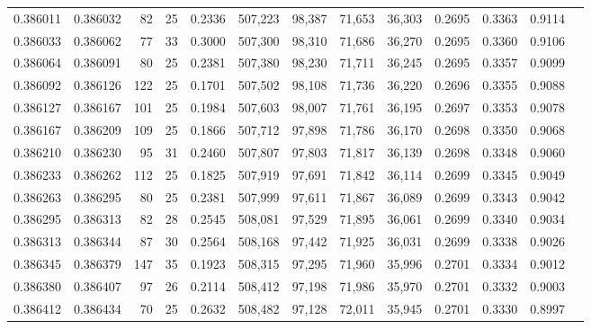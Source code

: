 \begin{tabular}{rrrrrrrrrrrrr}
0.386011 & 0.386032 &    82 &  25 &                                     0.2336 & 507,223 &  98,387 &  71,653 &  36,303 & 0.2695 & 0.3363 & 0.9114 \\
0.386033 & 0.386062 &    77 &  33 &                                     0.3000 & 507,300 &  98,310 &  71,686 &  36,270 & 0.2695 & 0.3360 & 0.9106 \\
0.386064 & 0.386091 &    80 &  25 &                                     0.2381 & 507,380 &  98,230 &  71,711 &  36,245 & 0.2695 & 0.3357 & 0.9099 \\
0.386092 & 0.386126 &   122 &  25 &                                     0.1701 & 507,502 &  98,108 &  71,736 &  36,220 & 0.2696 & 0.3355 & 0.9088 \\
0.386127 & 0.386167 &   101 &  25 &                                     0.1984 & 507,603 &  98,007 &  71,761 &  36,195 & 0.2697 & 0.3353 & 0.9078 \\
0.386167 & 0.386209 &   109 &  25 &                                     0.1866 & 507,712 &  97,898 &  71,786 &  36,170 & 0.2698 & 0.3350 & 0.9068 \\
0.386210 & 0.386230 &    95 &  31 &                                     0.2460 & 507,807 &  97,803 &  71,817 &  36,139 & 0.2698 & 0.3348 & 0.9060 \\
0.386233 & 0.386262 &   112 &  25 &                                     0.1825 & 507,919 &  97,691 &  71,842 &  36,114 & 0.2699 & 0.3345 & 0.9049 \\
0.386263 & 0.386295 &    80 &  25 &                                     0.2381 & 507,999 &  97,611 &  71,867 &  36,089 & 0.2699 & 0.3343 & 0.9042 \\
0.386295 & 0.386313 &    82 &  28 &                                     0.2545 & 508,081 &  97,529 &  71,895 &  36,061 & 0.2699 & 0.3340 & 0.9034 \\
0.386313 & 0.386344 &    87 &  30 &                                     0.2564 & 508,168 &  97,442 &  71,925 &  36,031 & 0.2699 & 0.3338 & 0.9026 \\
0.386345 & 0.386379 &   147 &  35 &                                     0.1923 & 508,315 &  97,295 &  71,960 &  35,996 & 0.2701 & 0.3334 & 0.9012 \\
0.386380 & 0.386407 &    97 &  26 &                                     0.2114 & 508,412 &  97,198 &  71,986 &  35,970 & 0.2701 & 0.3332 & 0.9003 \\
0.386412 & 0.386434 &    70 &  25 &                                     0.2632 & 508,482 &  97,128 &  72,011 &  35,945 & 0.2701 & 0.3330 & 0.8997 \\

\end{tabular}
